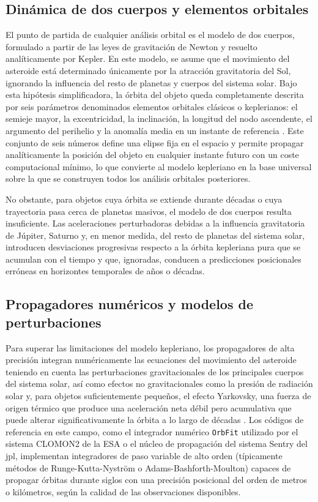 \documentclass[12pt]{report} %
\begin{document}
\subsection{Dinámica de dos cuerpos y elementos orbitales}
 
El punto de partida de cualquier análisis orbital es el modelo de dos cuerpos, formulado a partir de las leyes de gravitación de Newton y resuelto analíticamente por Kepler. En este modelo, se asume que el movimiento del asteroide está determinado únicamente por la atracción gravitatoria del Sol, ignorando la influencia del resto de planetas y cuerpos del sistema solar. Bajo esta hipótesis simplificadora, la órbita del objeto queda completamente descrita por seis parámetros denominados elementos orbitales clásicos o keplerianos: el semieje mayor, la excentricidad, la inclinación, la longitud del nodo ascendente, el argumento del perihelio y la anomalía media en un instante de referencia \cite{battin1999introduction}. Este conjunto de seis números define una elipse fija en el espacio y permite propagar analíticamente la posición del objeto en cualquier instante futuro con un coste computacional mínimo, lo que convierte al modelo kepleriano en la base universal sobre la que se construyen todos los análisis orbitales posteriores.
 
No obstante, para objetos cuya órbita se extiende durante décadas o cuya trayectoria pasa cerca de planetas masivos, el modelo de dos cuerpos resulta insuficiente. Las aceleraciones perturbadoras debidas a la influencia gravitatoria de Júpiter, Saturno y, en menor medida, del resto de planetas del sistema solar, introducen desviaciones progresivas respecto a la órbita kepleriana pura que se acumulan con el tiempo y que, ignoradas, conducen a predicciones posicionales erróneas en horizontes temporales de años o décadas.
 
\subsection{Propagadores numéricos y modelos de perturbaciones}
 
Para superar las limitaciones del modelo kepleriano, los propagadores de alta precisión integran numéricamente las ecuaciones del movimiento del asteroide teniendo en cuenta las perturbaciones gravitacionales de los principales cuerpos del sistema solar, así como efectos no gravitacionales como la presión de radiación solar y, para objetos suficientemente pequeños, el efecto Yarkovsky, una fuerza de origen térmico que produce una aceleración neta débil pero acumulativa que puede alterar significativamente la órbita a lo largo de décadas \cite{vokrouhlicky2015yarkovsky}. Los códigos de referencia en este campo, como el integrador numérico \texttt{OrbFit} utilizado por el sistema CLOMON2 de la ESA o el núcleo de propagación del sistema Sentry del \gls{jpl}, implementan integradores de paso variable de alto orden (típicamente métodos de Runge-Kutta-Nyström o Adams-Bashforth-Moulton) capaces de propagar órbitas durante siglos con una precisión posicional del orden de metros o kilómetros, según la calidad de las observaciones disponibles.
 
\end{document}
